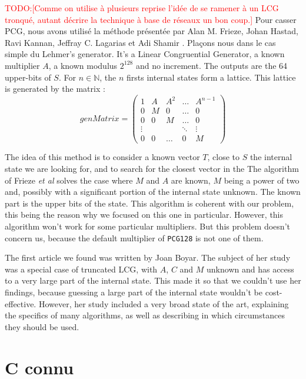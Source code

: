 \documentclass[preprint]{iacrtrans}
\newcommand{\todo}[1]{\textcolor{red}{TODO:[#1]}}
\begin{document}
\todo{Comme on utilise à plusieurs reprise l'idée de se ramener à un LCG
  tronqué, autant décrire la technique à base de réseaux un bon coup.}
Pour casser PCG, nous avons utilisé la méthode présentée par Alan M. Frieze, Johan Hastad, Ravi Kannan, Jeffray C. Lagarias et Adi Shamir \cite{Frieze}. Plaçons nous dans le cas simple du Lehmer's generator. It's a Linear Congruential Generator, a known multiplier $A$, a known modulus $2^128$ and no increment. The outputs are the 64 upper-bits of $S$. For $n \in \mathbb{N}$, the $n$ firsts internal states form a lattice. This lattice is generated by the matrix :
\begin{equation}
genMatrix =
\begin{pmatrix} 
1 & A & A^2 & \dots & A^{n- 1}\\
0 & M & 0 & \dots & 0\\
0 & 0 & M & \dots & 0\\
\vdots & & & \ddots & \vdots\\
0 & 0 & \dots & 0 & M
\end{pmatrix}
\end{equation}

The idea of this method is to consider a known vector $T$, close to $S$ the internal state we are looking for, and to search for the closest vector in the 
The algorithm of Frieze \textit{et al}\cite{Frieze} solves the case where $M$
and $A$ are known, $M$ being a power of two and, possibly with a significant
portion of the internal state unknown. The known part is the upper bits of the
state. This algorithm is coherent with our problem, this being the reason why we
focused on this one in particular. However, this algorithm won't work for some
particular multipliers. But this problem doesn't concern us, because the default
multiplier of \texttt{PCG128} is not one of them.

The first article we found was written by Joan Boyar\cite{Boyar1989}. The
subject of her study was a special case of truncated LCG, with $A$, $C$ and $M$
unknown and has access to a very large part of the internal state. This made it
so that we couldn't use her findings, because guessing a large part of the
internal state wouldn't be cost-effective. However, her study included a very
broad state of the art, explaining the specifics of many algorithms, as well as
describing in which circumstances they should be used.




\section{C connu}
\end{document}

